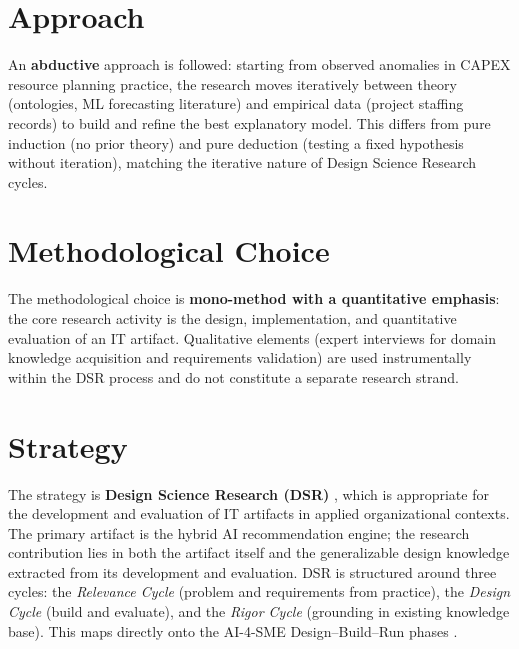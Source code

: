 \section{Approach}
\label{sec:approach}

An \textbf{abductive} approach is followed: starting from observed anomalies in CAPEX resource
planning practice, the research moves iteratively between theory (ontologies, ML forecasting
literature) and empirical data (project staffing records) to build and refine the best
explanatory model. This differs from pure induction (no prior theory) and pure deduction
(testing a fixed hypothesis without iteration), matching the iterative nature of Design Science
Research cycles.

\section{Methodological Choice}
\label{sec:methodological_choice}

The methodological choice is \textbf{mono-method with a quantitative emphasis}: the core
research activity is the design, implementation, and quantitative evaluation of an IT artifact.
Qualitative elements (expert interviews for domain knowledge acquisition and requirements
validation) are used instrumentally within the DSR process and do not constitute a separate
research strand.

\section{Strategy}
\label{sec:strategy}

The strategy is \textbf{Design Science Research (DSR)} \parencite{hevner2004design}, which is
appropriate for the development and evaluation of IT artifacts in applied organizational
contexts. The primary artifact is the hybrid AI recommendation engine; the research contribution
lies in both the artifact itself and the generalizable design knowledge extracted from its
development and evaluation. DSR is structured around three cycles: the \textit{Relevance Cycle}
(problem and requirements from practice), the \textit{Design Cycle} (build and evaluate),
and the \textit{Rigor Cycle} (grounding in existing knowledge base). This maps directly onto
the AI-4-SME Design–Build–Run phases \parencite{peter2025ai4sme}.

